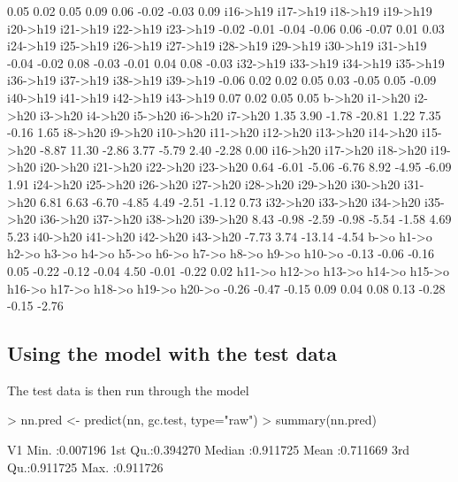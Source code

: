 \documentclass{article}
\begin{document}
\begin{Schunk}
\begin{Soutput}
    0.05     0.02     0.05     0.09     0.06    -0.02    -0.03     0.09 
i16->h19 i17->h19 i18->h19 i19->h19 i20->h19 i21->h19 i22->h19 i23->h19 
   -0.02    -0.01    -0.04    -0.06     0.06    -0.07     0.01     0.03 
i24->h19 i25->h19 i26->h19 i27->h19 i28->h19 i29->h19 i30->h19 i31->h19 
   -0.04    -0.02     0.08    -0.03    -0.01     0.04     0.08    -0.03 
i32->h19 i33->h19 i34->h19 i35->h19 i36->h19 i37->h19 i38->h19 i39->h19 
   -0.06     0.02     0.02     0.05     0.03    -0.05     0.05    -0.09 
i40->h19 i41->h19 i42->h19 i43->h19 
    0.07     0.02     0.05     0.05 
  b->h20  i1->h20  i2->h20  i3->h20  i4->h20  i5->h20  i6->h20  i7->h20 
    1.35     3.90    -1.78   -20.81     1.22     7.35    -0.16     1.65 
 i8->h20  i9->h20 i10->h20 i11->h20 i12->h20 i13->h20 i14->h20 i15->h20 
   -8.87    11.30    -2.86     3.77    -5.79     2.40    -2.28     0.00 
i16->h20 i17->h20 i18->h20 i19->h20 i20->h20 i21->h20 i22->h20 i23->h20 
    0.64    -6.01    -5.06    -6.76     8.92    -4.95    -6.09     1.91 
i24->h20 i25->h20 i26->h20 i27->h20 i28->h20 i29->h20 i30->h20 i31->h20 
    6.81     6.63    -6.70    -4.85     4.49    -2.51    -1.12     0.73 
i32->h20 i33->h20 i34->h20 i35->h20 i36->h20 i37->h20 i38->h20 i39->h20 
    8.43    -0.98    -2.59    -0.98    -5.54    -1.58     4.69     5.23 
i40->h20 i41->h20 i42->h20 i43->h20 
   -7.73     3.74   -13.14    -4.54 
  b->o  h1->o  h2->o  h3->o  h4->o  h5->o  h6->o  h7->o  h8->o  h9->o h10->o 
 -0.13  -0.06  -0.16   0.05  -0.22  -0.12  -0.04   4.50  -0.01  -0.22   0.02 
h11->o h12->o h13->o h14->o h15->o h16->o h17->o h18->o h19->o h20->o 
 -0.26  -0.47  -0.15   0.09   0.04   0.08   0.13  -0.28  -0.15  -2.76 
\end{Soutput}
\end{Schunk}

\subsection*{Using the model with the test data}
The test data is then run through the model
\begin{Schunk}
\begin{Sinput}
> nn.pred <- predict(nn, gc.test, type="raw")
> summary(nn.pred)
\end{Sinput}
\begin{Soutput}
       V1          
 Min.   :0.007196  
 1st Qu.:0.394270  
 Median :0.911725  
 Mean   :0.711669  
 3rd Qu.:0.911725  
 Max.   :0.911726  
\end{Soutput}
\end{Schunk}
\end{document}
